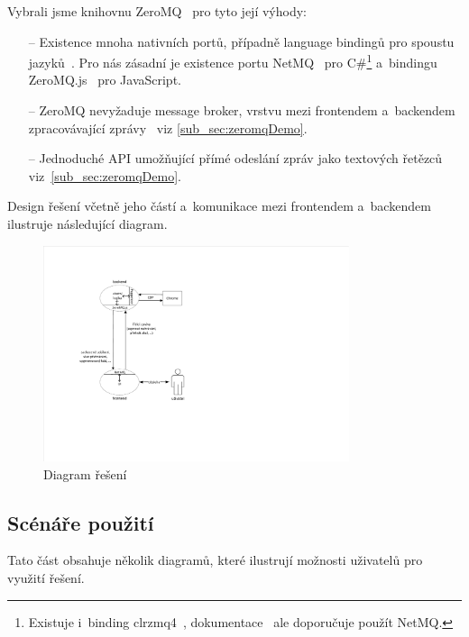 \documentclass[12pt, a4paper, twoside]{article}
\begin{document}
	\newpage
	Vybrali jsme knihovnu ZeroMQ~\cite{zeromq} pro tyto její výhody:
	\begin{itemize}
		\item[--] Existence mnoha nativních portů, případně language bindingů pro spoustu jazyků~\cite{zeromqDocs}. Pro nás zásadní je existence portu NetMQ~\cite{netmqGithub} pro C\#\footnote{Existuje i~binding clrzmq4~\cite{crlzmq4}, dokumentace~\cite{zeromqCSharp} ale doporučuje použít NetMQ.} a~bindingu ZeroMQ.js~\cite{zeromqJs} pro JavaScript.
		\item[--] ZeroMQ nevyžaduje message broker, vrstvu mezi frontendem a~backendem zpracovávající zprávy~\cite{messageBroker} viz \ref{sub_sec:zeromqDemo}.
		\item[--] Jednoduché API umožňující přímé odeslání zpráv jako textových řetězců viz~\ref{sub_sec:zeromqDemo}.
	\end{itemize}
	Design řešení včetně jeho částí a~komunikace mezi frontendem a~backendem ilustruje následující diagram.
	\nopagebreak
	\begin{figure}[H]
		\centering
		\includegraphics[width=0.8\textwidth]{design.pdf}
		\caption{Diagram řešení}
	\end{figure}
	\newpage
	\subsection{Scénáře použití}
	Tato část obsahuje několik diagramů, které ilustrují možnosti uživatelů pro využití řešení.
\end{document}
